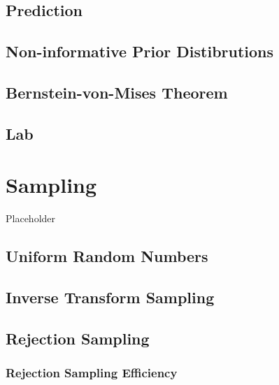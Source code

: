 \documentclass[
]{book}
\begin{document}
\hypertarget{prediction}{%
\section{Prediction}\label{prediction}}

\hypertarget{non-informative-prior-distibrutions}{%
\section{Non-informative Prior Distibrutions}\label{non-informative-prior-distibrutions}}

\hypertarget{bernstein-von-mises-theorem}{%
\section{Bernstein-von-Mises Theorem}\label{bernstein-von-mises-theorem}}

\hypertarget{lab}{%
\section{Lab}\label{lab}}

\hypertarget{sampling}{%
\chapter{Sampling}\label{sampling}}

Placeholder

\hypertarget{uniform-random-numbers}{%
\section{Uniform Random Numbers}\label{uniform-random-numbers}}

\hypertarget{inverse-transform-sampling}{%
\section{Inverse Transform Sampling}\label{inverse-transform-sampling}}

\hypertarget{rejection-sampling}{%
\section{Rejection Sampling}\label{rejection-sampling}}

\hypertarget{rejection-sampling-efficiency}{%
\subsection{Rejection Sampling Efficiency}\label{rejection-sampling-efficiency}}
\end{document}
